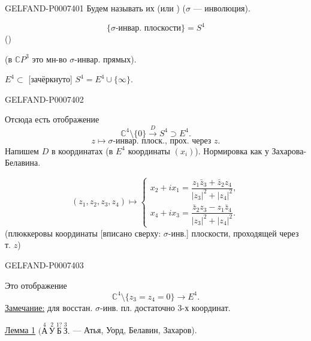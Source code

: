 \begin{GelfandAdjacentEvidence}{GELFAND-P000740}{1}
Будем называть их  (или )
(\(\sigma\) --- инволюция).

\begin{equation*}
\tag*{(6)\hfill}
\{\sigma\text{-инвар. плоскости}\}=S^4
\end{equation*}
()

(в \(\mathbb C P^3\) это мн-во \(\sigma\)-инвар. прямых).

\(E^4\subset\) [зачёркнуто] \(S^4=E^4\cup\{\infty\}\).
\end{GelfandAdjacentEvidence}
\begin{GelfandAdjacentEvidence}{GELFAND-P000740}{2}


Отсюда есть отображение
\begin{equation*}
\tag*{(7)\hfill}
\mathbb C^4\setminus\{0\}\overset{D}{\longrightarrow}S^4\supset E^4.
\end{equation*}
\[
z\longmapsto \sigma\text{-инвар. плоск., прох. через }z.
\]
Напишем \(D\) в координатах (\(\text{в } E^4\) координаты \((x_i)\)).
Нормировка как у Захарова-Белавина.

\[
(z_1,z_2,z_3,z_4)\longmapsto
\begin{cases}
x_2+i x_1=\dfrac{z_1\bar z_3+\bar z_2 z_4}{|z_3|^2+|z_4|^2},\\[6pt]
x_4+i x_3=\dfrac{\bar z_2 z_3-z_1\bar z_4}{|z_3|^2+|z_4|^2}.
\end{cases}
\]
(плюккеровы координаты [вписано сверху: \(\sigma\)-инв.] плоскости, проходящей через т. \(z\))
\end{GelfandAdjacentEvidence}
\begin{GelfandAdjacentEvidence}{GELFAND-P000740}{3}


Это отображение
\[
\mathbb C^4\setminus\{z_3=z_4=0\}\longrightarrow E^4.
\]
\underline{Замечание:} для восстан. \(\sigma\)-инв. пл. достаточно 3-х координат.

\underline{\underline{Лемма 1}}
\(\bigl(\overset{4}{\text{А}}\,
\overset{2}{\text{У}}\,
\overset{1?}{\text{Б}}\,
\overset{3}{\text{З}}\bigr.\)
--- Атья, Уорд, Белавин, Захаров).
\end{GelfandAdjacentEvidence}
